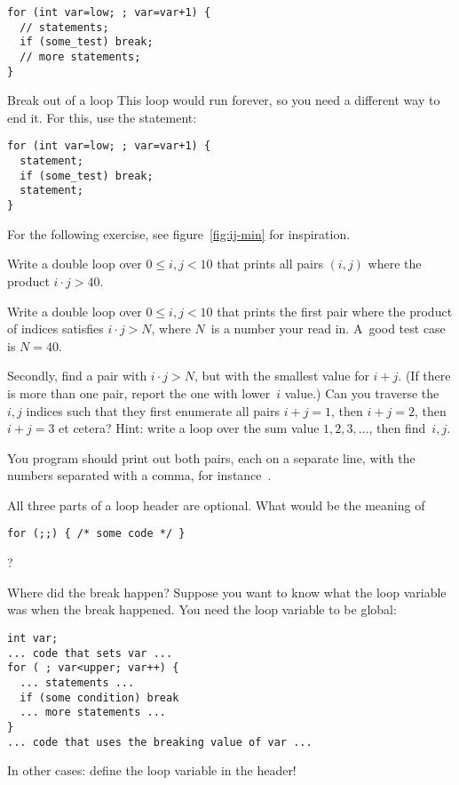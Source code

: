 \begin{lstlisting}
for (int var=low; ; var=var+1) {
  // statements;
  if (some_test) break;
  // more statements;
}
\end{lstlisting}

\begin{slide}{Break out of a loop}
  \label{sl:for-break}
  This loop would run forever, so you need a different way to end
  it. For this, use the  statement:
\begin{lstlisting}
for (int var=low; ; var=var+1) {
  statement;
  if (some_test) break;
  statement;
}
\end{lstlisting}
\end{slide}

For the following exercise, see figure~\ref{fig:ij-min} for inspiration.

\begin{exercise}
  \label{ex:ij-print}
  Write a double loop over $0\leq i,j<10$ that prints all pairs
  $(i,j)$ where the product $i\cdot j>40$.
  
\end{exercise}
\begin{exercise}
  \label{ex:ij-product}
  Write a double loop over $0\leq i,j<10$ that prints the first pair
  where the product of indices satisfies $i\cdot j> N$, where $N$~is a
  number your read in. A~good test case is $N=40$.

  Secondly, find a pair with $i\cdot j>N$,
  but with the smallest value for $i+j$.
  (If there is more than one pair, report the one with lower~$i$ value.)
  Can you traverse the $i,j$ indices such that they first enumerate
  all pairs $i+j=1$, then $i+j=2$, then $i+j=3$ et cetera? Hint:
  write a loop over the sum value $1,2,3,\ldots$, then find~$i,j$.

  You program should print out both pairs, each on a separate line,
  with the numbers separated with a comma, for instance~.
\end{exercise}

\begin{exercise}
  All three parts of a loop header are optional. What would be the
  meaning of
\begin{lstlisting}
for (;;) { /* some code */ }
\end{lstlisting}
?
\end{exercise}

\begin{block}{Where did the break happen?}
  \label{sl:for-break-var}
  Suppose you want to know what the loop variable was when the break happened.
  You need the loop variable to be global:
\begin{lstlisting}
int var;
... code that sets var ...
for ( ; var<upper; var++) {
  ... statements ...
  if (some condition) break
  ... more statements ...
}
... code that uses the breaking value of var ...
\end{lstlisting}
In other cases: define the loop variable in the header!
\end{block}

